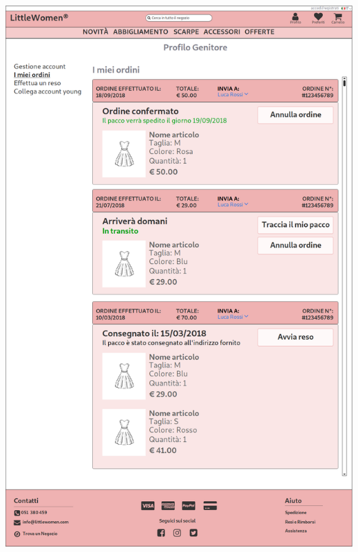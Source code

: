 \documentclass[12pt,a4paper]{report}
\begin{document}
\includegraphics[width=\textwidth]{"Project Management Sources/Wireframe/WireFrame Screenshot/Desktop/16 - Profilo Ordini"}
\end{document}
